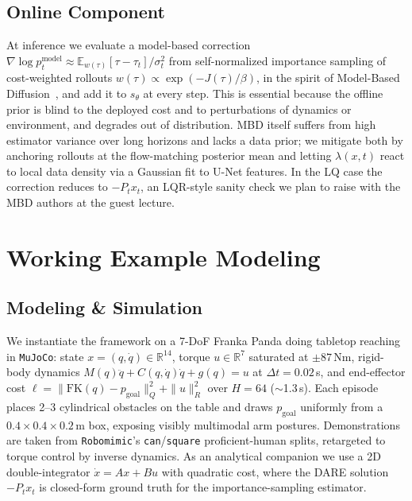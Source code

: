 \documentclass[conference]{IEEEtran}
\begin{document}
\subsection{Online Component}


At inference we evaluate a model-based correction
$\nabla\log p^{\mathrm{model}}_t\!\approx\!
\mathbb{E}_{w(\tau)}[\tau-\tau_t]/\sigma_t^2$ from self-normalized
importance sampling of cost-weighted rollouts
$w(\tau)\propto\exp(-J(\tau)/\beta)$, in the spirit of Model-Based
Diffusion~\cite{mbd}, and add it to $s_\theta$ at every step. This
is essential because the offline prior is blind to the deployed cost
and to perturbations of dynamics or environment, and degrades out of
distribution. MBD itself suffers from high estimator variance over
long horizons and lacks a data prior; we mitigate both by anchoring
rollouts at the flow-matching posterior mean and letting
$\lambda(x,t)$ react to local data density via a Gaussian fit to
U-Net features. In the LQ case the correction reduces to
$-P_t x_t$, an LQR-style sanity check we plan to raise with the MBD
authors at the guest lecture.

\section{Working Example Modeling}

\subsection{Modeling \& Simulation}


We instantiate the framework on a 7-DoF Franka Panda doing tabletop
reaching in \texttt{MuJoCo}: state
$x=(q,\dot q)\!\in\!\mathbb{R}^{14}$, torque
$u\!\in\!\mathbb{R}^{7}$ saturated at $\pm 87$\,Nm, rigid-body
dynamics $M(q)\ddot q+C(q,\dot q)\dot q+g(q)=u$ at
$\Delta t=0.02$\,s, and end-effector cost
$\ell=\|\mathrm{FK}(q)-p_{\mathrm{goal}}\|_Q^2+\|u\|_R^2$ over
$H\!=\!64$ ($\sim$1.3\,s). Each episode places 2--3 cylindrical
obstacles on the table and draws $p_{\mathrm{goal}}$ uniformly from
a $0.4\!\times\!0.4\!\times\!0.2$\,m box, exposing visibly multimodal
arm postures. Demonstrations are taken from \texttt{Robomimic}'s
\texttt{can}/\texttt{square} proficient-human splits, retargeted to
torque control by inverse dynamics. As an analytical companion we
use a 2D double-integrator $\dot x=Ax+Bu$ with quadratic cost,
where the DARE solution $-P_t x_t$ is closed-form ground truth for
the importance-sampling estimator.
\end{document}
